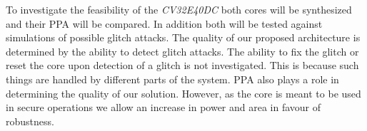To investigate the feasibility of the \textit{CV32E40DC} both cores will be synthesized and their PPA will be compared. In addition both will be tested against simulations of possible glitch attacks. The quality of our proposed architecture is determined by the ability to detect glitch attacks. The ability to fix the glitch or reset the core upon detection of a glitch is not investigated. This is because such things are handled by different parts of the system. PPA also plays a role in determining the quality of our solution. However, as the core is meant to be used in secure operations we allow an increase in power and area in favour of robustness. 
